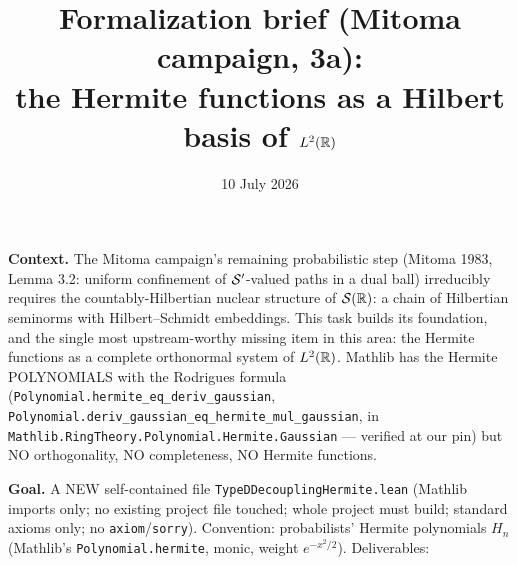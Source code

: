 \documentclass[11pt]{article}
\title{Formalization brief (Mitoma campaign, 3a):\\
the Hermite functions as a Hilbert basis of $L^2(\mathbb{R})$}
\date{10 July 2026}
\theoremstyle{plain}
\theoremstyle{remark}
\begin{document}
\maketitle

\noindent\textbf{Context.} The Mitoma campaign's remaining probabilistic
step (Mitoma 1983, Lemma 3.2: uniform confinement of $\mathcal{S}'$-valued paths
in a dual ball) irreducibly requires the countably-Hilbertian nuclear
structure of $\mathcal{S}(\mathbb{R})$: a chain of Hilbertian seminorms with
Hilbert--Schmidt embeddings. This task builds its foundation, and the
single most upstream-worthy missing item in this area: the Hermite
functions as a complete orthonormal system of $L^2(\mathbb{R})$. Mathlib has the
Hermite POLYNOMIALS with the Rodrigues formula
(\texttt{Polynomial.hermite\_eq\_deriv\_gaussian},
\texttt{Polynomial.deriv\_gaussian\_eq\_hermite\_mul\_gaussian}, in
\texttt{Mathlib.RingTheory.Polynomial.Hermite.Gaussian} --- verified at
our pin) but NO orthogonality, NO completeness, NO Hermite functions.

\medskip
\noindent\textbf{Goal.} A NEW self-contained file
\texttt{TypeDDecouplingHermite.lean} (Mathlib imports only; no existing
project file touched; whole project must build; standard axioms only; no
\texttt{axiom}/\texttt{sorry}). Convention: probabilists' Hermite
polynomials $H_n$ (Mathlib's \texttt{Polynomial.hermite}, monic, weight
$e^{-x^2/2}$). Deliverables:
\end{document}
